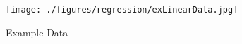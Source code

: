\begin{figure}[ht!]
\texttt{[image: ./figures/regression/exLinearData.jpg]}
\centering
\caption{Example Data}
\label{fig:exLinearData}
\end{figure}
